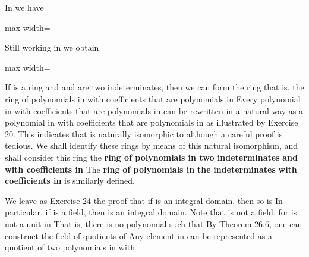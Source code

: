 \documentclass[11pt,oneside]{article}
\begin{document}
\begin{BookBody}
 In  we have

\begin{center}\begin{adjustbox}{max width=\linewidth}\end{adjustbox}\end{center}

\noindent Still working in  we obtain

\begin{center}\begin{adjustbox}{max width=\linewidth}\end{adjustbox}\end{center} \BookEnd{\blacktriangle}

If  is a ring and  and  are two indeterminates, then we can form the ring  that is, the ring of polynomials in  with coefficients that are polynomials in  Every polynomial in  with coefficients that are polynomials in  can be rewritten in a natural way as a polynomial in  with coefficients that are polynomials in  as illustrated by Exercise 20. This indicates that  is naturally isomorphic to  although a careful proof is tedious. We shall identify these rings by means of this natural isomorphism, and shall consider this ring  the\textbf{ ring of polynomials in two inde}\textbf{terminates}  \textbf{and}  \textbf{with coefficients in}  The\textbf{ ring}  \textbf{of polynomials in} \textbf{the}  \textbf{indeterminates}  \textbf{with coefficients in}  is similarly defined.

We leave as Exercise 24 the proof that if  is an integral domain, then so is  In particular, if  is a field, then  is an integral domain. Note that  is not a field, for  is not a unit in  That is, there is no polynomial  such that  By Theorem 26.6, one can construct the field of quotients  of  Any element in  can be represented as a quotient  of two polynomials in  with

\end{BookBody}
\end{document}

